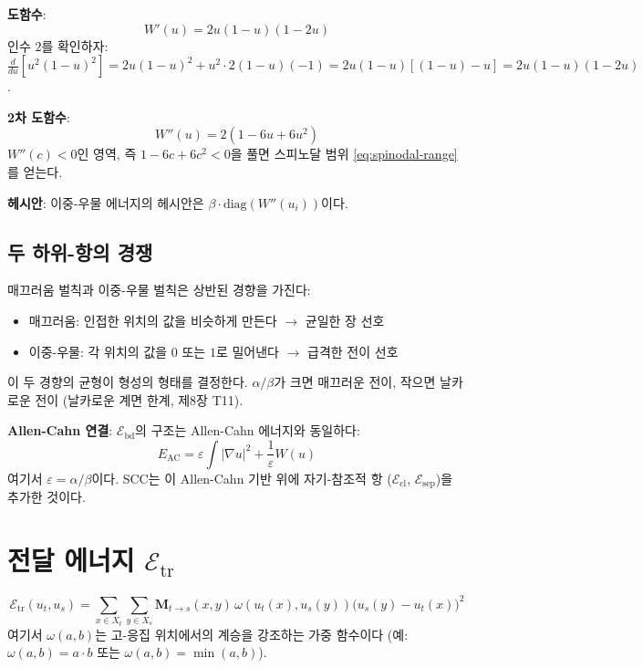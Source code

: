 \textbf{도함수}:
\begin{equation}
    W'(u) = 2u(1-u)(1-2u)
    \label{eq:W-prime}
\end{equation}
인수 $2$를 확인하자: $\frac{d}{du}[u^2(1-u)^2] = 2u(1-u)^2 + u^2 \cdot 2(1-u)(-1) = 2u(1-u)[(1-u) - u] = 2u(1-u)(1-2u)$.

\textbf{2차 도함수}:
\begin{equation}
    W''(u) = 2(1 - 6u + 6u^2)
    \label{eq:W-double-prime}
\end{equation}
$W''(c) < 0$인 영역, 즉 $1 - 6c + 6c^2 < 0$을 풀면 스피노달 범위 \eqref{eq:spinodal-range}를 얻는다.

\textbf{헤시안}: 이중-우물 에너지의 헤시안은 $\beta \cdot \mathrm{diag}(W''(u_i))$이다.

\subsection{두 하위-항의 경쟁}

매끄러움 벌칙과 이중-우물 벌칙은 상반된 경향을 가진다:
\begin{itemize}
    \item 매끄러움: 인접한 위치의 값을 비슷하게 만든다 $\to$ 균일한 장 선호
    \item 이중-우물: 각 위치의 값을 $0$ 또는 $1$로 밀어낸다 $\to$ 급격한 전이 선호
\end{itemize}

이 두 경향의 균형이 형성의 형태를 결정한다. $\alpha/\beta$가 크면 매끄러운 전이, 작으면 날카로운 전이 (날카로운 계면 한계, 제8장 T11).

\textbf{Allen-Cahn 연결}: $\mathcal{E}_{\mathrm{bd}}$의 구조는 Allen-Cahn 에너지와 동일하다:
\begin{equation}
    E_{\mathrm{AC}} = \varepsilon \int |\nabla u|^2 + \frac{1}{\varepsilon} W(u)
\end{equation}
여기서 $\varepsilon = \alpha/\beta$이다. SCC는 이 Allen-Cahn 기반 위에 자기-참조적 항 ($\mathcal{E}_{\mathrm{cl}}$, $\mathcal{E}_{\mathrm{sep}}$)을 추가한 것이다.


\section{전달 에너지 $\mathcal{E}_{\mathrm{tr}}$}
\label{sec:transport-energy}

\begin{equation}
    \mathcal{E}_{\mathrm{tr}}(u_t, u_s) = \sum_{x \in X_t} \sum_{y \in X_s} \mathbf{M}_{t \to s}(x,y)\, \omega(u_t(x), u_s(y)) \big( u_s(y) - u_t(x) \big)^2
    \label{eq:E-tr}
\end{equation}
여기서 $\omega(a,b)$는 고-응집 위치에서의 계승을 강조하는 가중 함수이다 (예: $\omega(a,b) = a \cdot b$ 또는 $\omega(a,b) = \min(a,b)$).

